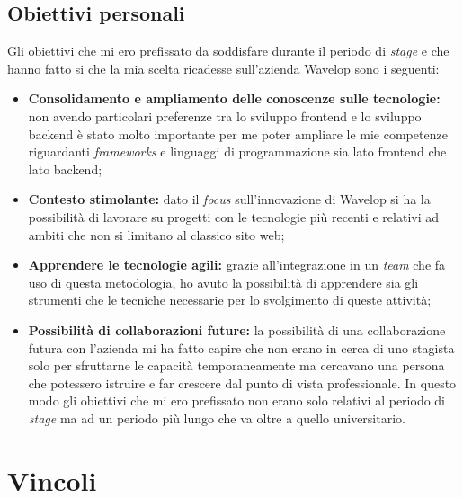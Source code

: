 \subsection{Obiettivi personali}
Gli obiettivi che mi ero prefissato da soddisfare durante il periodo di \emph{stage} e che hanno fatto si che la mia scelta ricadesse sull'azienda Wavelop sono i seguenti:
\begin{itemize}
  \item \textbf{Consolidamento e ampliamento delle conoscenze sulle tecnologie:} non avendo particolari preferenze tra lo sviluppo \gls{frontend} e lo sviluppo \gls{backend} è stato molto importante per me poter ampliare le mie competenze riguardanti \emph{frameworks} e linguaggi di programmazione sia lato \gls{frontend} che lato \gls{backend};
  \item \textbf{Contesto stimolante:} dato il \emph{focus} sull'innovazione di Wavelop si ha la possibilità di lavorare su progetti con le tecnologie più recenti e relativi ad ambiti che non si limitano al classico sito web;
  \item \textbf{Apprendere le tecnologie agili:} grazie all'integrazione in un \emph{team} che fa uso di questa metodologia, ho avuto la possibilità di apprendere sia gli strumenti che le tecniche necessarie per lo svolgimento di queste attività;
  \item \textbf{Possibilità di collaborazioni future:} la possibilità di una collaborazione futura con l'azienda mi ha fatto capire che non erano in cerca di uno stagista solo per sfruttarne le capacità temporaneamente ma cercavano una persona che potessero istruire e far crescere dal punto di vista professionale. In questo modo gli obiettivi che mi ero prefissato non erano solo relativi al periodo di \emph{stage} ma ad un periodo più lungo che va oltre a quello universitario.
\end{itemize}

\section{Vincoli}

